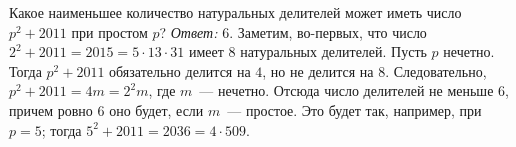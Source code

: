 \problem
Какое наименьшее количество натуральных делителей может иметь число
$p^2 + 2011$ при простом $p$?
\solution
\emph{Ответ:} $6$.
Заметим, во-первых, что число
$2^2 + 2011 = 2015 = 5 \cdot 13 \cdot 31$
имеет $8$ натуральных делителей.
Пусть $p$ нечетно.
Тогда $p^2 + 2011$ обязательно делится на $4$, но не делится на $8$.
Следовательно, $p^2 + 2011 = 4 m = 2^2 m$, где $m$~--- нечетно.
Отсюда число делителей не меньше $6$, причем ровно $6$ оно будет, если
$m$~--- простое.
Это будет так, например, при $p = 5$; тогда $5^2 + 2011 = 2036 = 4 \cdot 509$.
\endproblem

